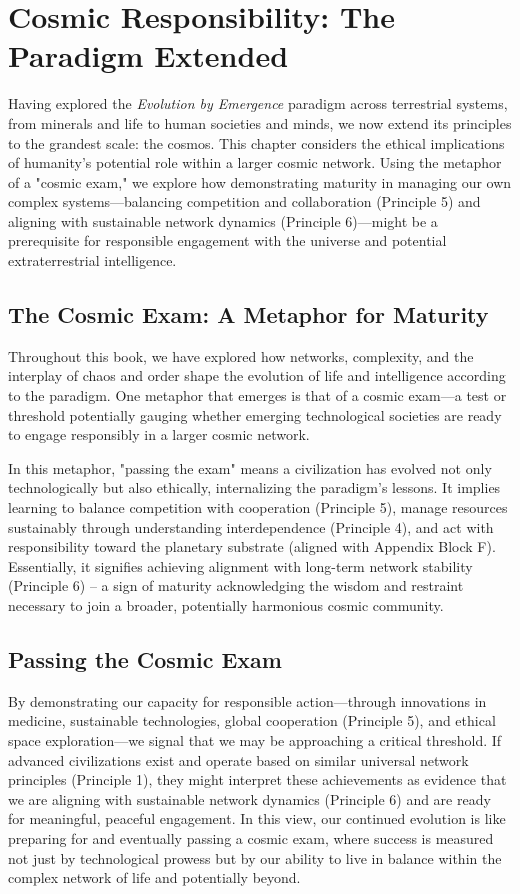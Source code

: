 \chapter{Cosmic Responsibility: The Paradigm Extended} %
\label{ch:CosmicResponsibility}

Having explored the \emph{Evolution by Emergence} paradigm across terrestrial systems, from minerals and life to human societies and minds, we now extend its principles to the grandest scale: the cosmos. This chapter considers the ethical implications of humanity's potential role within a larger cosmic network. Using the metaphor of a "cosmic exam," we explore how demonstrating maturity in managing our own complex systems—balancing competition and collaboration (Principle 5) and aligning with sustainable network dynamics (Principle 6)—might be a prerequisite for responsible engagement with the universe and potential extraterrestrial intelligence. %

\section{The Cosmic Exam: A Metaphor for Maturity}
Throughout this book, we have explored how networks, complexity, and the interplay of chaos and order shape the evolution of life and intelligence according to the paradigm. One metaphor that emerges is that of a cosmic exam—a test or threshold potentially gauging whether emerging technological societies are ready to engage responsibly in a larger cosmic network.

In this metaphor, "passing the exam" means a civilization has evolved not only technologically but also ethically, internalizing the paradigm's lessons. It implies learning to balance competition with cooperation (Principle 5), manage resources sustainably through understanding interdependence (Principle 4), and act with responsibility toward the planetary substrate (aligned with Appendix Block F). Essentially, it signifies achieving alignment with long-term network stability (Principle 6) – a sign of maturity acknowledging the wisdom and restraint necessary to join a broader, potentially harmonious cosmic community. %

\section{Passing the Cosmic Exam}
By demonstrating our capacity for responsible action—through innovations in medicine, sustainable technologies, global cooperation (Principle 5), and ethical space exploration—we signal that we may be approaching a critical threshold. If advanced civilizations exist and operate based on similar universal network principles (Principle 1), they might interpret these achievements as evidence that we are aligning with sustainable network dynamics (Principle 6) and are ready for meaningful, peaceful engagement. In this view, our continued evolution is like preparing for and eventually passing a cosmic exam, where success is measured not just by technological prowess but by our ability to live in balance within the complex network of life and potentially beyond. %

